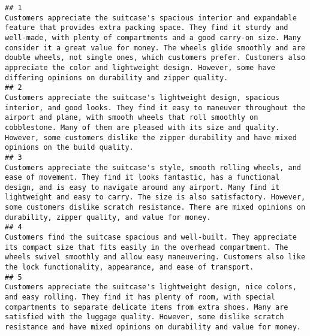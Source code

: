 \documentclass[
]{article}
\begin{document}
\begin{verbatim}
## 1                                                                                                                                            Customers appreciate the suitcase's spacious interior and expandable feature that provides extra packing space. They find it sturdy and well-made, with plenty of compartments and a good carry-on size. Many consider it a great value for money. The wheels glide smoothly and are double wheels, not single ones, which customers prefer. Customers also appreciate the color and lightweight design. However, some have differing opinions on durability and zipper quality.
## 2                                                                                                                                                                                                                                                    Customers appreciate the suitcase's lightweight design, spacious interior, and good looks. They find it easy to maneuver throughout the airport and plane, with smooth wheels that roll smoothly on cobblestone. Many of them are pleased with its size and quality. However, some customers dislike the zipper durability and have mixed opinions on the build quality.
## 3                                                                                                                                                                                                                      Customers appreciate the suitcase's style, smooth rolling wheels, and ease of movement. They find it looks fantastic, has a functional design, and is easy to navigate around any airport. Many find it lightweight and easy to carry. The size is also satisfactory. However, some customers dislike scratch resistance. There are mixed opinions on durability, zipper quality, and value for money.
## 4                                                                                                                                                                                                                                                                                                                                                   Customers find the suitcase spacious and well-built. They appreciate its compact size that fits easily in the overhead compartment. The wheels swivel smoothly and allow easy maneuvering. Customers also like the lock functionality, appearance, and ease of transport.
## 5                                                                                                                                                                                                                                                                             Customers appreciate the suitcase's lightweight design, nice colors, and easy rolling. They find it has plenty of room, with special compartments to separate delicate items from extra shoes. Many are satisfied with the luggage quality. However, some dislike scratch resistance and have mixed opinions on durability and value for money.

\end{verbatim}
\end{document}
